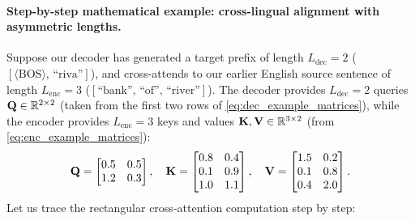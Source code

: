 \documentclass[../../main.tex]{subfiles}
\begin{document}
\paragraph{Step-by-step mathematical example: cross-lingual alignment with asymmetric lengths.}
Suppose our decoder has generated a target prefix of length $L_{\text{dec}} = 2$ ($[\langle\text{BOS}\rangle,\, \text{``riva''}]$), and cross-attends to our earlier English source sentence of length $L_{\text{enc}} = 3$ ($[\text{``bank''},\, \text{``of''},\, \text{``river''}]$).
The decoder provides $L_{\text{dec}} = 2$ queries $\mathbf{Q} \in \mathbb{R}^{2 \times 2}$ (taken from the first two rows of \eqref{eq:dec_example_matrices}), while the encoder provides $L_{\text{enc}} = 3$ keys and values $\mathbf{K}, \mathbf{V} \in \mathbb{R}^{3 \times 2}$ (from \eqref{eq:enc_example_matrices}):
\begin{equation}
\label{eq:cross_example_matrices}
\mathbf{Q} = \begin{bmatrix}
0.5 & 0.5 \\
1.2 & 0.3
\end{bmatrix}, \quad
\mathbf{K} = \begin{bmatrix}
0.8 & 0.4 \\
0.1 & 0.9 \\
1.0 & 1.1
\end{bmatrix}, \quad
\mathbf{V} = \begin{bmatrix}
1.5 & 0.2 \\
0.1 & 0.8 \\
0.4 & 2.0
\end{bmatrix}.
\end{equation}
Let us trace the rectangular cross-attention computation step by step:
\end{document}
